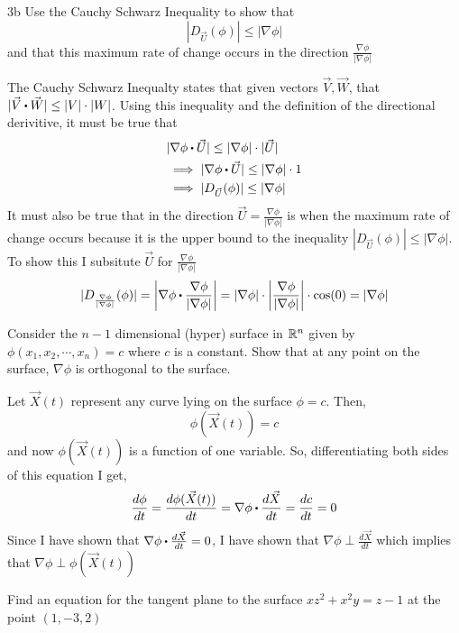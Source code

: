\documentclass[titlepage]{article}
\begin{document}
\begin{problem}{3b}
Use the Cauchy Schwarz Inequality to show that
$$ |D_{\vec{U}}(\phi)| \leq |\nabla\phi| $$
and that this maximum rate of change occurs in the direction $\frac{\nabla\phi}{|\nabla\phi|} $
\end{problem}
\begin{solution}
The Cauchy Schwarz Inequalty states that given vectors $\vec{V}, \vec{W}$, that $|\vec{V} \bigcdot \vec{W}| \leq |V|\cdot|W|$. Using this inequality and the definition of the directional derivitive, it must be true that
\begin{align*}
&|\nabla\phi \bigcdot \vec{U}| \leq |\nabla\phi|\cdot |\vec{U}| \\
&\implies |\nabla\phi \bigcdot \vec{U}| \leq |\nabla\phi| \cdot 1\\
&\implies |D_{\vec{U}}(\phi)| \leq |\nabla\phi|
\end{align*}
It must also be true that in the direction $\vec{U} = \frac{\nabla\phi}{|\nabla\phi|}$ is when the maximum rate of change occurs because it is the upper bound to the inequality $|D_{\vec{U}}(\phi)| \leq |\nabla\phi|$. To show this I subsitute $\vec{U}$ for $\frac{\nabla\phi}{|\nabla\phi|}$
$$|D_{\frac{\nabla\phi}{|\nabla\phi|}}(\phi)| = \left|\nabla\phi \bigcdot \frac{\nabla\phi}{|\nabla\phi|}\right| = |\nabla\phi|\cdot\bigg|\frac{\nabla\phi}{|\nabla\phi|}\bigg|\cdot\cos(0)=|\nabla\phi|$$
\end{solution}

\begin{problem}{4}
Consider the $n-1$ dimensional (hyper) surface in $\mathbb{R}^n$ given by $\phi(x_1,x_2,\cdots,x_n) = c$ where $c$ is a constant. Show that at any point on the surface, $\nabla\phi$ is orthogonal to the surface.
\end{problem}

\begin{solution}
Let $\vec{X}(t)$ represent any curve lying on the surface $\phi = c$. Then,
$$\phi(\vec{X}(t)) = c$$
and now $\phi(\vec{X}(t))$ is a function of one variable. So, differentiating both sides of this equation I get,
$$\frac{d\phi}{dt}=\frac{d\phi(\vec{X}(t))}{dt}= \nabla\phi\bigcdot\frac{d\vec{X}}{dt} =\frac{dc}{dt} = 0$$
Since I have shown that $\nabla\phi \bigcdot \frac{d\vec{X}}{dt} = 0$, I have shown that $\nabla\phi \perp \frac{d\vec{X}}{dt}$ which implies that $\nabla\phi \perp \phi(\vec{X}(t))$
\end{solution}

\begin{problem}{5}
Find an equation for the tangent plane to the surface $xz^2 + x^2y = z-1$ at the point $(1,-3,2)$
\end{problem}
\end{document}
